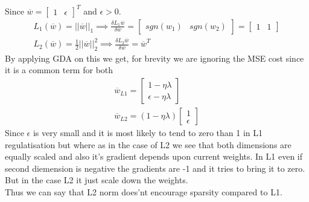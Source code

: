 \documentclass{article}
\begin{document}
Since $\overline{w} = \begin{bmatrix} 1 & \epsilon \end{bmatrix}^T$ and $\epsilon > 0$.\\
\begin{gather*}
L_1(\overline{w}) = ||\overline{w}||_1 \implies \frac{\delta L_1{\overline{w}}}{\delta \overline{w}} = \begin{bmatrix} sgn(w_1) & sgn(w_2) \end{bmatrix} = \begin{bmatrix} 1 & 1 \end{bmatrix}\\
L_2(\overline{w}) = \frac{1}{2}||\overline{w}||^{2}_{2} \implies \frac{\delta L_2{\overline{w}}}{\delta \overline{w}} = \overline{w}^T
\end{gather*}
By applying GDA on this we get, for brevity we are ignoring the MSE cost since it is a common term for both
\begin{gather*}
\overline{w}_{L1} = \begin{bmatrix}
1 - {\eta}{\lambda} \\
\epsilon - {\eta}{\lambda}
\end{bmatrix}\\
\overline{w}_{L2} = (1 - {\eta}{\lambda}) \begin{bmatrix}
1 \\
\epsilon
\end{bmatrix}
\end{gather*}
Since $\epsilon$ is very small and it is most likely to tend to zero than 1 in L1 regulatisation but where as in the case of L2 we see that both dimensions are equally scaled and also it's gradient depends upon current weights. In L1 even if second diemension is negative the gradients are -1 and it tries to bring it to zero. But in the case L2 it just scale down the weights.\\
 Thus we can say that L2 norm does'nt encourage sparsity compared to L1.
\end{document}
